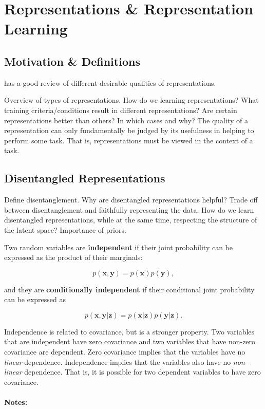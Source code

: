 \chapter{Representations \& Representation Learning}

\section{Motivation \& Definitions}

\cite{bengio2013representation} has a good review of different desirable qualities of representations.

Overview of types of representations. How do we learning representations? What training criteria/conditions result in different representations? Are certain representations better than others? In which cases and why? The quality of a representation can only fundamentally be judged by its usefulness in helping to perform some task. That is, representations must be viewed in the context of a task.



\section{Disentangled Representations}

Define disentanglement. Why are disentangled representations helpful? Trade off between disentanglement and faithfully representing the data. How do we learn disentangled representations, while at the same time, respecting the structure of the latent space? Importance of priors.

Two random variables are \textbf{independent} if their joint probability can be expressed as the product of their marginals:

\begin{equation}
	p(\mathbf{x}, \mathbf{y}) = p(\mathbf{x}) p(\mathbf{y}),
\end{equation}

\noindent and they are \textbf{conditionally independent} if their conditional joint probability can be expressed as

\begin{equation}
	p(\mathbf{x}, \mathbf{y} | \mathbf{z}) = p(\mathbf{x} | \mathbf{z}) p(\mathbf{y} | \mathbf{z}).
\end{equation}

Independence is related to covariance, but is a stronger property. Two variables that are independent have zero covariance and two variables that have non-zero covariance are dependent. Zero covariance implies that the variables have no \textit{linear} dependence. Independence implies that the variables also have no \textit{non-linear} dependence. That is, it is possible for two dependent variables to have zero covariance. 
\\
\\
\noindent \textbf{Notes:}

